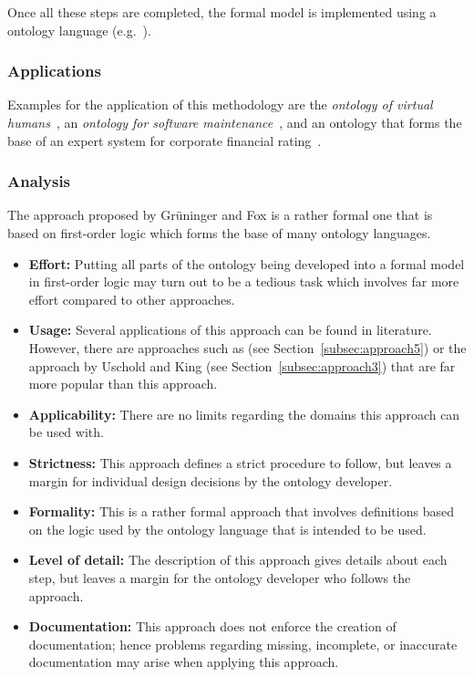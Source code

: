 Once all these steps are completed, the formal model is implemented using a ontology language (e.g.\ ).

\subsubsection{Applications}

Examples for the application of this methodology are the \emph{ontology of virtual humans}~\cite{tove_example1}, an \emph{ontology for software maintenance}~\cite{tove_example2}, and an ontology that forms the base of an expert system for corporate financial rating~\cite{tove_example3}.

\subsubsection{Analysis}

The approach proposed by Grüninger and Fox is a rather formal one that is based on first-order logic which forms the base of many ontology languages.

\begin{itemize}
  \item \textbf{Effort:} Putting all parts of the ontology being developed into a formal model in first-order logic may turn out to be a tedious task which involves far more effort compared to other approaches.
  
  \item \textbf{Usage:} Several applications of this approach can be found in literature. However, there are approaches such as \methontology (see Section~\ref{subsec:approach5}) or the approach by Uschold and King (see Section~\ref{subsec:approach3}) that are far more popular than this approach.
  
  \item \textbf{Applicability:} There are no limits regarding the domains this approach can be used with.
  
  \item \textbf{Strictness:} This approach defines a strict procedure to follow, but leaves a margin for individual design decisions by the ontology developer.
  
  \item \textbf{Formality:} This is a rather formal approach that involves definitions based on the logic used by the ontology language that is intended to be used.
  
  \item \textbf{Level of detail:} The description of this approach gives details about each step, but leaves a margin for the ontology developer who follows the approach.
  
  \item \textbf{Documentation:} This approach does not enforce the creation of documentation; hence problems regarding missing, incomplete, or inaccurate documentation may arise when applying this approach.
\end{itemize}

